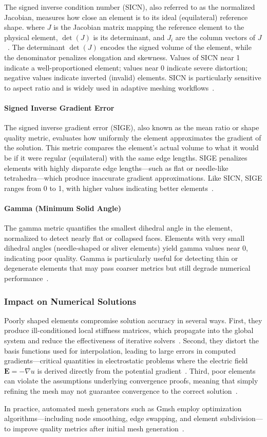The signed inverse condition number (SICN), also referred to as the normalized Jacobian, measures how close an element is to its ideal (equilateral) reference shape.
where $J$ is the Jacobian matrix mapping the reference element to the physical element, $\det(J)$ is its determinant, and $J_i$ are the column vectors of $J$~\cite{gmsh,knupp}. The determinant $\det(J)$ encodes the signed volume of the element, while the denominator penalizes elongation and skewness. Values of SICN near 1 indicate a well-proportioned element; values near 0 indicate severe distortion; negative values indicate inverted (invalid) elements. SICN is particularly sensitive to aspect ratio and is widely used in adaptive meshing workflows~\cite{knupp}.

\paragraph*{Signed Inverse Gradient Error}

The signed inverse gradient error (SIGE), also known as the mean ratio or shape quality metric, evaluates how uniformly the element approximates the gradient of the solution. This metric compares the element's actual volume to what it would be if it were regular (equilateral) with the same edge lengths. SIGE penalizes elements with highly disparate edge lengths—such as flat or needle-like tetrahedra—which produce inaccurate gradient approximations. Like SICN, SIGE ranges from 0 to 1, with higher values indicating better elements~\cite{gmsh, pebay-2003}.

\paragraph*{Gamma (Minimum Solid Angle)}

The gamma metric quantifies the smallest dihedral angle in the element, normalized to detect nearly flat or collapsed faces. Elements with very small dihedral angles (needle-shaped or sliver elements) yield gamma values near 0, indicating poor quality. Gamma is particularly useful for detecting thin or degenerate elements that may pass coarser metrics but still degrade numerical performance~\cite{knupp}.

\subsubsection{Impact on Numerical Solutions}

Poorly shaped elements compromise solution accuracy in several ways. First, they produce ill-conditioned local stiffness matrices, which propagate into the global system and reduce the effectiveness of iterative solvers~\cite{shewchuk-2002}. Second, they distort the basis functions used for interpolation, leading to large errors in computed gradients—critical quantities in electrostatic problems where the electric field $\mathbf{E} = -\nabla u$ is derived directly from the potential gradient~\cite{erdbrugger-2023}. Third, poor elements can violate the assumptions underlying convergence proofs, meaning that simply refining the mesh may not guarantee convergence to the correct solution~\cite{zienkiewicz-2013}.

In practice, automated mesh generators such as Gmsh employ optimization algorithms—including node smoothing, edge swapping, and element subdivision—to improve quality metrics after initial mesh generation~\cite{gmsh}.


